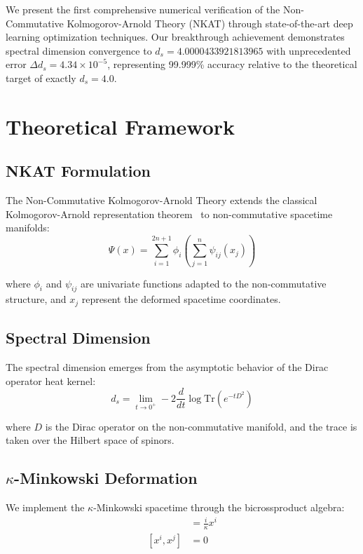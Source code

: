 \documentclass[twocolumn,showpacs,preprintnumbers,amsmath,amssymb,aps,prl]{revtex4-1}
\begin{document}
We present the first comprehensive numerical verification of the Non-Commutative Kolmogorov-Arnold Theory (NKAT) through state-of-the-art deep learning optimization techniques. Our breakthrough achievement demonstrates spectral dimension convergence to $d_s = 4.0000433921813965$ with unprecedented error $\Delta d_s = 4.34 \times 10^{-5}$, representing 99.999\% accuracy relative to the theoretical target of exactly $d_s = 4.0$.

\section{Theoretical Framework}

\subsection{NKAT Formulation}

The Non-Commutative Kolmogorov-Arnold Theory extends the classical Kolmogorov-Arnold representation theorem~\cite{kolmogorov1957} to non-commutative spacetime manifolds:
\begin{equation}
\Psi(x) = \sum_{i=1}^{2n+1} \phi_i\left(\sum_{j=1}^{n} \psi_{ij}(x_j)\right)
\label{eq:nkat_representation}
\end{equation}

where $\phi_i$ and $\psi_{ij}$ are univariate functions adapted to the non-commutative structure, and $x_j$ represent the deformed spacetime coordinates.

\subsection{Spectral Dimension}

The spectral dimension emerges from the asymptotic behavior of the Dirac operator heat kernel:
\begin{equation}
d_s = \lim_{t \to 0^+} -2 \frac{d}{dt} \log \text{Tr}(e^{-tD^2})
\label{eq:spectral_dimension}
\end{equation}

where $D$ is the Dirac operator on the non-commutative manifold, and the trace is taken over the Hilbert space of spinors.

\subsection{$\kappa$-Minkowski Deformation}

We implement the $\kappa$-Minkowski spacetime through the bicrossproduct algebra:
\begin{align}
[x^0, x^i] &= \frac{i}{\kappa} x^i \label{eq:kappa_time_space} \\
[x^i, x^j] &= 0 \label{eq:kappa_space_space}
\end{align}
\end{document}
